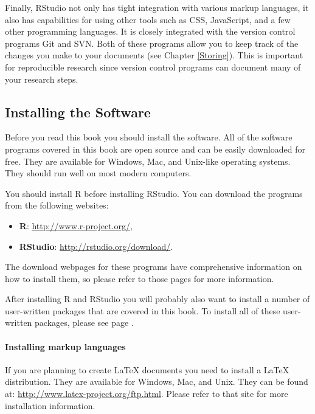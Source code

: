 Finally, RStudio not only has tight integration with various markup languages, it also has capabilities for using other tools such as CSS, JavaScript, and a few other programming languages. It is closely integrated with the version control programs Git and SVN. Both of these programs allow you to keep track of the changes you make to your documents (see Chapter \ref{Storing}). This is important for reproducible research since version control programs can document many of your research steps. 

\subsection{Installing the Software}\label{InstallR}

Before you read this book you should install the software. All of the software programs covered in this book are open source and can be easily downloaded for free. They are available for Windows, Mac, and Unix-like operating systems. They should run well on most modern computers. 

You should install R before installing RStudio. You can download the programs from the following websites:

\begin{itemize}
    \item {\bf{R}}: \url{http://www.r-project.org/},
    \item {\bf{RStudio}}: \url{http://rstudio.org/download/}.
\end{itemize}

\noindent The download webpages for these programs have comprehensive information on how to install them, so please refer to those pages for more information.

After installing R and RStudio you will probably also want to install a number of user-written packages that are covered in this book. To install all of these user-written packages, please see page \pageref{ReqPackages}.

\paragraph{Installing markup languages}

If you are planning to create LaTeX documents you need to install a LaTeX distribution. They are available for Windows, Mac, and Unix. They can be found at: \url{http://www.latex-project.org/ftp.html}. Please refer to that site for more installation information.


